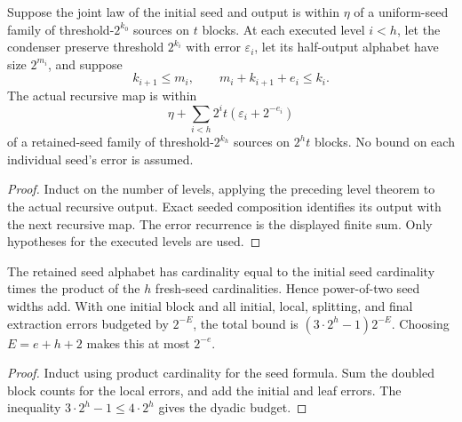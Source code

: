 \begin{theorem}
  \label{thm:lowerbounds-algebraic-recursive-block-source}
  \leanok
  Suppose the joint law of the initial seed and output is within $\eta$
  of a uniform-seed family of threshold-$2^{k_0}$ sources on $t$ blocks.
  At each executed level $i<h$, let the condenser
  preserve threshold $2^{k_i}$ with error $\varepsilon_i$, let its half-output
  alphabet have size $2^{m_i}$, and suppose
  \[
    k_{i+1}\le m_i,\qquad m_i+k_{i+1}+e_i\le k_i.
  \]
  The actual recursive map is within
  \[
    \eta+\sum_{i<h}2^it(\varepsilon_i+2^{-e_i})
  \]
  of a retained-seed family of threshold-$2^{k_h}$ sources on $2^ht$ blocks.
  No bound on each individual seed's error is assumed.
\end{theorem}
\begin{proof}
  \leanok
  Induct on the number of levels, applying the preceding level theorem to
  the actual recursive output. Exact seeded composition identifies its
  output with the next recursive map. The error recurrence is the displayed
  finite sum. Only hypotheses for the executed levels are used.
\end{proof}

\begin{theorem}
  \label{thm:lowerbounds-algebraic-recursive-block-budget}
  \leanok
  The retained seed alphabet has cardinality equal to the initial seed
  cardinality times the product of the $h$ fresh-seed cardinalities.
  Hence power-of-two seed widths add. With one initial block and all
  initial, local, splitting, and final extraction errors budgeted by
  $2^{-E}$, the total bound is
  $(3\cdot2^h-1)2^{-E}$. Choosing $E=e+h+2$ makes this at most $2^{-e}$.
\end{theorem}
\begin{proof}
  \leanok
  Induct using product cardinality for the seed formula. Sum the doubled
  block counts for the local errors, and add the initial and leaf errors.
  The inequality $3\cdot2^h-1\le4\cdot2^h$ gives the dyadic budget.
\end{proof}

